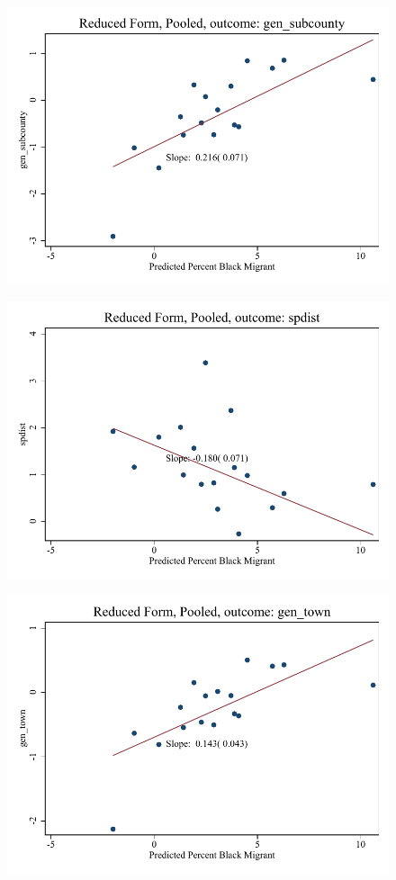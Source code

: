 \documentclass{article}
\begin{document}
\clearpage
\begin{figure}
	\centering
	\includegraphics[width=.8\textwidth]{figures/binscatter/pooled_gen_subcounty_rf_percent.pdf}
\end{figure}
\clearpage
\begin{figure}
	\centering
	\includegraphics[width=.8\textwidth]{figures/binscatter/pooled_spdist_rf_percent.pdf}
\end{figure}
\clearpage
\begin{figure}
	\centering
	\includegraphics[width=.8\textwidth]{figures/binscatter/pooled_gen_town_rf_percent.pdf}
\end{figure}
\clearpage
\end{document}

